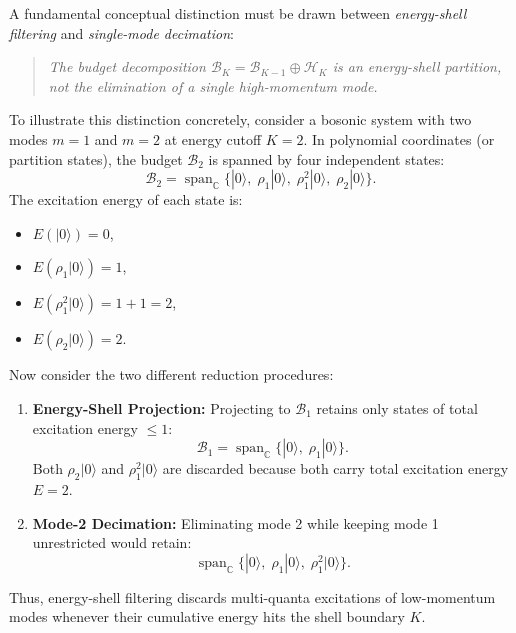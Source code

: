 A fundamental conceptual distinction must be drawn between \emph{energy-shell filtering} and \emph{single-mode decimation}:
\begin{quote}
\emph{The budget decomposition $\mathcal{B}_K = \mathcal{B}_{K-1} \oplus \mathcal{H}_K$ is an energy-shell partition, not the elimination of a single high-momentum mode.}
\end{quote}
To illustrate this distinction concretely, consider a bosonic system with two modes $m=1$ and $m=2$ at energy cutoff $K = 2$. In polynomial coordinates (or partition states), the budget $\mathcal{B}_2$ is spanned by four independent states:
\begin{equation}
\mathcal{B}_2 = \operatorname{span}_{\mathbb{C}} \Big\{ |0\rangle, \; \rho_1 |0\rangle, \; \rho_1^2 |0\rangle, \; \rho_2 |0\rangle \Big\}.
\end{equation}
The excitation energy of each state is:
\begin{itemize}
    \item $E(|0\rangle) = 0$,
    \item $E(\rho_1 |0\rangle) = 1$,
    \item $E(\rho_1^2 |0\rangle) = 1 + 1 = 2$,
    \item $E(\rho_2 |0\rangle) = 2$.
\end{itemize}
Now consider the two different reduction procedures:
\begin{enumerate}
    \item \textbf{Energy-Shell Projection:} Projecting to $\mathcal{B}_1$ retains only states of total excitation energy $\le 1$:
    \[
    \mathcal{B}_1 = \operatorname{span}_{\mathbb{C}} \Big\{ |0\rangle, \; \rho_1 |0\rangle \Big\}.
    \]
    Both $\rho_2 |0\rangle$ and $\rho_1^2 |0\rangle$ are discarded because both carry total excitation energy $E = 2$.
    \item \textbf{Mode-2 Decimation:} Eliminating mode 2 while keeping mode 1 unrestricted would retain:
    \[
    \operatorname{span}_{\mathbb{C}} \Big\{ |0\rangle, \; \rho_1 |0\rangle, \; \rho_1^2 |0\rangle \Big\}.
    \]
\end{enumerate}
Thus, energy-shell filtering discards multi-quanta excitations of low-momentum modes whenever their cumulative energy hits the shell boundary $K$.


